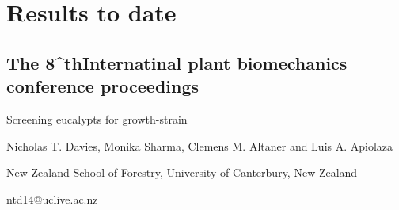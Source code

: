 \section{Results to date}
\subsection{ The 8^{th}Internatinal plant biomechanics conference proceedings}
Screening eucalypts for growth-strain

Nicholas T. Davies, Monika Sharma, Clemens M. Altaner and Luis A. Apiolaza

New Zealand School of Forestry, University of Canterbury, New Zealand

ntd14@uclive.ac.nz  



  